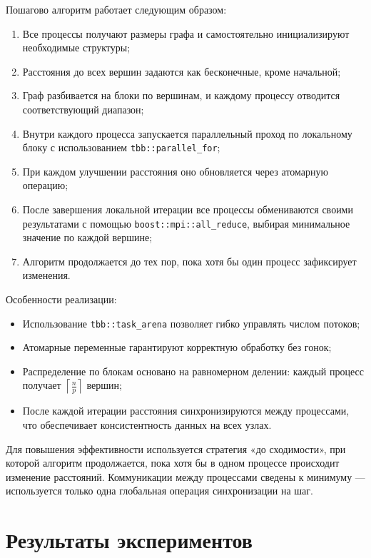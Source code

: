 \documentclass[12pt,a4paper]{extarticle}
\begin{document}
Пошагово алгоритм работает следующим образом:

\begin{enumerate}
    \item Все процессы получают размеры графа и самостоятельно инициализируют
    необходимые структуры;
    \item Расстояния до всех вершин задаются как бесконечные, кроме начальной;
    \item Граф разбивается на блоки по вершинам, и каждому процессу отводится
    соответствующий диапазон;
    \item Внутри каждого процесса запускается параллельный проход по локальному блоку
    с использованием \texttt{tbb::parallel\_for};
    \item При каждом улучшении расстояния оно обновляется через атомарную операцию;
    \item После завершения локальной итерации все процессы обмениваются своими результатами
    с помощью \texttt{boost::mpi::all\_reduce}, выбирая минимальное значение по каждой вершине;
    \item Алгоритм продолжается до тех пор, пока хотя бы один процесс зафиксирует изменения.
\end{enumerate}

Особенности реализации:

\begin{itemize}
    \item Использование \texttt{tbb::task\_arena} позволяет гибко управлять числом потоков;
    \item Атомарные переменные гарантируют корректную обработку без гонок;
    \item Распределение по блокам основано на равномерном делении: каждый процесс
    получает $\left\lceil \frac{n}{p} \right\rceil$ вершин;
    \item После каждой итерации расстояния синхронизируются между процессами,
    что обеспечивает консистентность данных на всех узлах.
\end{itemize}

Для повышения эффективности используется стратегия «до сходимости», при которой
алгоритм продолжается, пока хотя бы в одном процессе происходит изменение расстояний.
Коммуникации между процессами сведены к минимуму — используется только одна глобальная
операция синхронизации на шаг.

\section{Результаты экспериментов}
\end{document}
